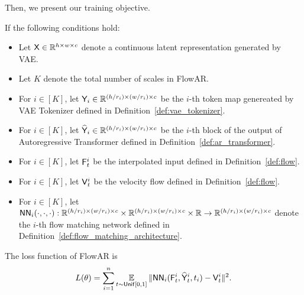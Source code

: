 Then, we present our training objective.
\begin{definition}
If the following conditions hold:
    \begin{itemize}
        \item Let $\mathsf{X} \in \mathbb{R}^{h \times w \times c}$ denote a continuous latent representation generated by VAE.
        \item Let $K$ denote the total number of scales in FlowAR.
        \item For $i \in [K]$, let $\mathsf{Y}_i \in \mathbb{R}^{(h / r_i) \times (w/r_i) \times c}$ be the $i$-th token map genereated by VAE Tokenizer defined in Definition~\ref{def:vae_tokenizer}.
        \item For $i \in [K]$, let $\widehat{\mathsf{Y}}_i \in \mathbb{R}^{(h / r_i) \times (w/r_i) \times c}$ be the $i$-th block of the output of Autoregressive Transformer defined in Definition~\ref{def:ar_transformer}.
        \item For $i \in [K]$, let $\mathsf{F}^i_t$ be the interpolated input defined in Definition~\ref{def:flow}.
        \item For $i \in [K]$, let $\mathsf{V}^i_t$ be the velocity flow defined in Definition~\ref{def:flow}.
        \item For $i \in [K]$, let $\mathsf{NN}_i(\cdot,\cdot,\cdot):\mathbb{R}^{(h / r_i) \times (w/r_i) \times c} \times \mathbb{R}^{(h / r_i) \times (w/r_i) \times c} \times \mathbb{R} \to \mathbb{R}^{(h / r_i) \times (w/r_i) \times c}$ denote the $i$-th flow matching network defined in Definition~\ref{def:flow_matching_architecture}.
    \end{itemize}
    The loss function of FlowAR is 
    \begin{align*}
        L(\theta) = \sum_{i=1}^n \operatorname*{{\mathbb{E}}}_{t \sim \mathsf{Unif}[0,1]}\|\mathsf{NN}_i(\mathsf{F}^i_t, \widehat{\mathsf{Y}}^{i}_t, t_i) - \mathsf{V}^i_t\|^2.
    \end{align*}
\end{definition}

